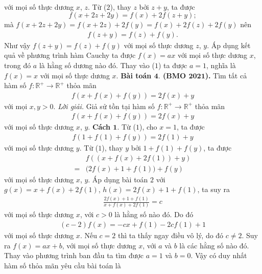 \begin{multicols}{2}
\begin{align*}
			\end{align*}	
			với mọi số thực dương $x$,  $z$.
			Từ ($2$), thay $z$ bởi $z+y$, ta được
			$$f\left( {x + 2z + 2y} \right) = f(x) + 2f(z + y);$$
			mà 
			$f\left( {x + 2z + 2y} \right)=f(x + 2z) + 2f(y) =f(x) + 2f(z) + 2f(y)$ nên 
			\begin{align*}
				f(z + y) = f(z) + f(y).
			\end{align*}
			Như vậy $f(z + y) = f(z) + f(y)$ với mọi số thực dương $z$, $y$. Áp dụng kết quả về phương trình hàm Cauchy ta được
			$f(x) = ax$ với mọi số thực dương $x$,  trong đó $a$ là hằng số dương nào đó. Thay vào ($1$) ta được $a=1$, nghĩa là $f(x)= x$ với mọi số thực dương $x$.
			\vskip 0.1cm
		\textbf{\color{hoccungpi}Bài toán $\pmb{4.}$ (BMO $\pmb{2021}$).}
		Tìm tất cả hàm số $f: \mathbb{R}^{+} \rightarrow \mathbb{R}^{+}$ thỏa mãn
		\begin{align*}
			f(x+f(x)+f(y))=2 f(x)+y
		\end{align*}
		với mọi $x, y>0$.
		\vskip 0.1cm
		\textit{Lời giải.}
			Giả sử tồn tại hàm số 
			$f: \mathbb{R}^{+} \rightarrow \mathbb{R}^{+}$ thỏa mãn 
			\begin{align*}
				f(x+f(x)+f(y))=2 f(x)+y \tag{$1$}
			\end{align*}
			với mọi số thực dương $x$, $y$.
			\vskip 0.1cm
			\textbf{\color{hoccungpi}Cách $\pmb{1.}$}
			Từ ($1$), cho $x=1$, ta được
			\begin{align*}
				f(1+f(1)+f(y))=2 f(1)+y
			\end{align*}
			với mọi số thực dương  $y$. 
			Từ ($1$), thay $y$ bởi $ 1+f(1)+f(y)$, ta được
			\begin{align*}
				&f((x+f(x)+2 f(1))+y)\\
				=&\big(2 f(x)+1+f(1)\big)+f(y)
			\end{align*}
			với mọi số thực dương $x$, $y$.
			Áp dụng bài toán $2$ với $g(x)=x+f(x)+2 f(1)$, $h(x)=2 f(x)+1+f(1)$, ta suy ra
			\begin{align*}
				\frac{2 f(x)+1+f(1)}{x+f(x)+2 f(1)}=c
			\end{align*}
			với mọi số thực dương $x$, với  $ c>0$  là hằng số nào đó.
			Do đó
			\begin{align*}
				(c-2) f(x)=-c x+f(1)-2 c f(1)+1
			\end{align*}
			với mọi số thực dương $x$.
			Nếu $c=2$ thì ta thấy ngay điều vô lý, do đó $c \neq 2$. Suy ra $f(x)=a x+b$, với mọi số thực dương $x$, với $a$ và $b$ là các hằng số nào đó.
			Thay vào phương trình ban đầu ta tìm được $a=1$ và $b=0$.
			Vậy có duy nhất hàm số thỏa mãn yêu cầu bài toán là

\end{multicols}

